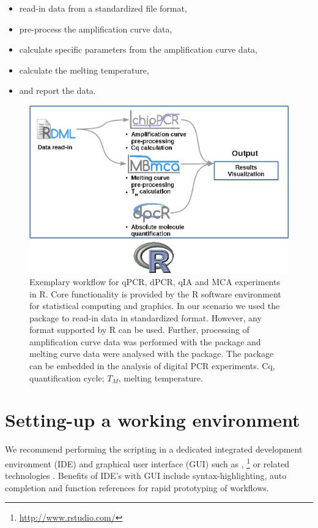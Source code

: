 \begin{itemize}
 \item read-in data from a standardized file format,
 \item pre-process the amplification curve data,
 \item calculate specific parameters from the amplification curve data,
 \item calculate the melting temperature,
 \item and report the data.
\end{itemize}

\begin{figure}[htbp]
  \centering
  \includegraphics{figures/workflow.png}
  \caption{Exemplary workflow for qPCR, dPCR, qIA and MCA experiments in R. Core 
functionality is provided by the R software environment for statistical 
computing and graphics. In our scenario we used the  package to 
read-in data in standardized format. However, any format supported by R can be 
used. Further, processing of amplification curve data was performed with the 
 package and melting curve data were analysed with the 
 package. The  package can be embedded in the 
analysis of digital PCR experiments. Cq, quantification cycle; $T_{M}$, melting 
temperature. 
} \label{figure:workflow}
\end{figure}

\section{Setting-up a working environment}

We recommend performing the scripting in a dedicated integrated development 
environment (IDE) and graphical user interface (GUI) such as  
\citep{rodiger_rkward_2012}, 
\footnote{\url{http://www.rstudio.com/}} or related technologies 
\citep{Valero_2012}. Benefits of IDE's with GUI include syntax-highlighting, 
auto completion and function references for rapid prototyping of workflows.

